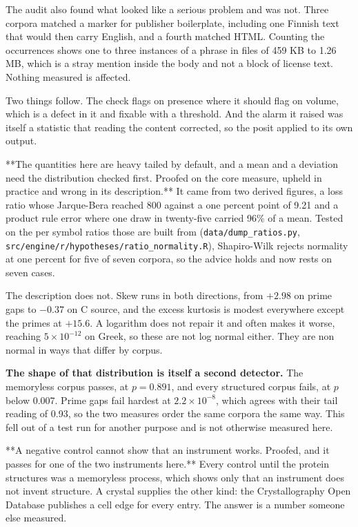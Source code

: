 The audit also found what looked like a serious problem and was not. Three corpora matched a marker for publisher boilerplate, including one Finnish text that would then carry English, and a fourth matched HTML. Counting the occurrences shows one to three instances of a phrase in files of 459 KB to 1.26 MB, which is a stray mention inside the body and not a block of license text. Nothing measured is affected.

Two things follow. The check flags on presence where it should flag on volume, which is a defect in it and fixable with a threshold. And the alarm it raised was itself a statistic that reading the content corrected, so the posit applied to its own output.

**The quantities here are heavy tailed by default, and a mean and a deviation need the distribution checked first. Proofed on the core measure, upheld in practice and wrong in its description.** It came from two derived figures, a loss ratio whose Jarque-Bera reached 800 against a one percent point of 9.21 and a product rule error where one draw in twenty-five carried 96\% of a mean. Tested on the per symbol ratios those are built from (\texttt{data/\allowbreak{}dump\_\allowbreak{}ratios.\allowbreak{}py}, \texttt{src/\allowbreak{}engine/\allowbreak{}r/\allowbreak{}hypotheses/\allowbreak{}ratio\_\allowbreak{}normality.\allowbreak{}R}), Shapiro-Wilk rejects normality at one percent for five of seven corpora, so the advice holds and now rests on seven cases.

The description does not. Skew runs in both directions, from \(+2.98\) on prime gaps to \(-0.37\) on C source, and the excess kurtosis is modest everywhere except the primes at \(+15.6\). A logarithm does not repair it and often makes it worse, reaching \(5 \times 10^{-12}\) on Greek, so these are not log normal either. They are non normal in ways that differ by corpus.

\textbf{The shape of that distribution is itself a second detector.} The memoryless corpus passes, at \(p = 0.891\), and every structured corpus fails, at \(p\) below 0.007. Prime gaps fail hardest at \(2.2 \times 10^{-8}\), which agrees with their tail reading of 0.93, so the two measures order the same corpora the same way. This fell out of a test run for another purpose and is not otherwise measured here.

**A negative control cannot show that an instrument works. Proofed, and it passes for one of the two instruments here.** Every control until the protein structures was a memoryless process, which shows only that an instrument does not invent structure. A crystal supplies the other kind: the Crystallography Open Database publishes a cell edge for every entry. The answer is a number someone else measured.


